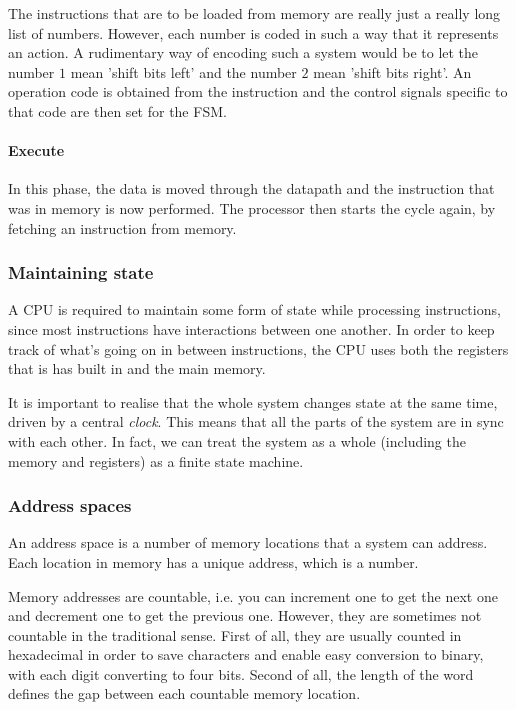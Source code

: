 The instructions that are to be loaded from memory are really just a really long
list of numbers. However, each number is coded in such a way that it represents
an action. A rudimentary way of encoding such a system would be to let the
number $1$ mean 'shift bits left' and the number $2$ mean 'shift bits right'. An
operation code is obtained from the instruction and the control signals specific
to that code are then set for the FSM.

\paragraph{Execute}\mbox{}


In this phase, the data is moved through the datapath and the instruction that
was in memory is now performed. The processor then starts the cycle again, by
fetching an instruction from memory.

\subsubsection{Maintaining state}

A CPU is required to maintain some form of state while processing instructions,
since most instructions have interactions between one another. In order to keep
track of what's going on in between instructions, the CPU uses both the registers
that is has built in and the main memory.

It is important to realise that the whole system changes state at the same time,
driven by a central {\it clock}. This means that all the parts of the system are
in sync with each other. In fact, we can treat the system as a whole (including
the memory and registers) as a finite state machine.

\subsubsection{Address spaces}

An address space is a number of memory locations that a system can address. Each
location in memory has a unique address, which is a number.

Memory addresses are countable, i.e. you can increment one to get the next one
and decrement one to get the previous one. However, they are sometimes not
countable in the traditional sense. First of all, they are usually counted in
hexadecimal in order to save characters and enable easy conversion to binary,
with each digit converting to four bits. Second of all, the length of the word
defines the gap between each countable memory location.

